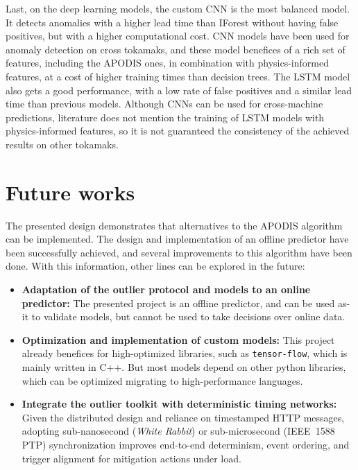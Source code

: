 Last, on the deep learning models, the custom \ac{CNN} is the most balanced model. It detects anomalies with a higher lead time than \ac{IForest} without having false positives, but with a higher computational cost. \ac{CNN} models have been used for anomaly detection on cross tokamaks, and these model benefices of a rich set of features, including the \ac{APODIS} ones, in combination with physics-informed features, at a cost of higher training times than decision trees. The \ac{LSTM} model also gets a good performance, with a low rate of false positives and a similar lead time than previous models. Although \ac{CNN}s can be used for cross-machine predictions, literature does not mention the training of \ac{LSTM} models with physics-informed features, so it is not guaranteed the consistency of the achieved results on other tokamaks. 

\section{Future works}

The presented design demonstrates that alternatives to the \ac{APODIS} algorithm can be implemented. The design and implementation of an offline predictor have been successfully achieved, and several improvements to this algorithm have been done. With this information, other lines can be explored in the future:

\begin{itemize}
    \item \textbf{Adaptation of the outlier protocol and models to an online predictor:} The presented project is an offline predictor, and can be used as-it to validate models, but cannot be used to take decisions over online data.
    \item \textbf{Optimization and implementation of custom models:} This project already benefices for high-optimized libraries, such as \texttt{tensor-flow}, which is mainly written in C++. But most models depend on other python libraries, which can be optimized migrating to high-performance languages.
    \item \textbf{Integrate the outlier toolkit with deterministic timing networks:} Given the distributed design and reliance on timestamped HTTP messages, adopting sub-nanosecond (\emph{White Rabbit}) or sub-microsecond (IEEE~1588 \ac{PTP}) synchronization improves end-to-end determinism, event ordering, and trigger alignment for mitigation actions under load.

\end{itemize}

